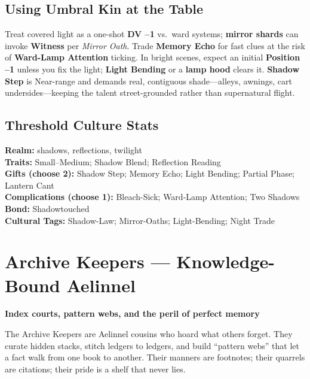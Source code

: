 \documentclass[11pt,letterpaper]{article}
\begin{document}
\subsection*{Using Umbral Kin at the Table}
Treat covered light as a one-shot \textbf{DV --1} vs.\ ward systems; \textbf{mirror shards} can invoke \textbf{Witness} per \emph{Mirror Oath}. Trade \textbf{Memory Echo} for fast clues at the risk of \textbf{Ward-Lamp Attention} ticking. In bright scenes, expect an initial \textbf{Position --1} unless you fix the light; \textbf{Light Bending} or a \textbf{lamp hood} clears it. \textbf{Shadow Step} is Near-range and demands real, contiguous shade---alleys, awnings, cart undersides---keeping the talent street-grounded rather than supernatural flight.

\subsection*{Threshold Culture Stats}
\textbf{Realm:} shadows, reflections, twilight \\
\textbf{Traits:} Small--Medium; Shadow Blend; Reflection Reading \\
\textbf{Gifts (choose 2):} Shadow Step; Memory Echo; Light Bending; Partial Phase; Lantern Cant \\
\textbf{Complications (choose 1):} Bleach-Sick; Ward-Lamp Attention; Two Shadows \\
\textbf{Bond:} Shadowtouched \\
\textbf{Cultural Tags:} Shadow-Law; Mirror-Oaths; Light-Bending; Night Trade

\section{Archive Keepers --- Knowledge-Bound Aelinnel}

\textbf{Index courts, pattern webs, and the peril of perfect memory}

The Archive Keepers are Aelinnel cousins who hoard what others forget. They curate hidden stacks, stitch ledgers to ledgers, and build ``pattern webs'' that let a fact walk from one book to another. Their manners are footnotes; their quarrels are citations; their pride is a shelf that never lies.
\end{document}
